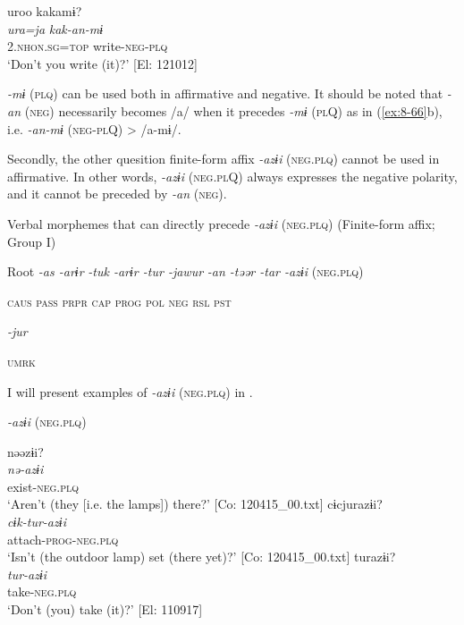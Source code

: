   {\TM}
\glll  uroo  kakamɨ?\\
\textit{ura=ja}  \textit{kak-an-mɨ}\\
    2.\textsc{nhon}.\textsc{sg}=\textsc{top}  write-\textsc{neg}-\textsc{plq}\\
\glt ‘Don’t you write (it)?’ [El: 121012]

\z
\z

\textit{-mɨ} (\textsc{plq}) can be used both in affirmative and negative. It should be noted that \textit{-an} (\textsc{neg}) necessarily becomes /a/ when it precedes \textit{-mɨ} (\textsc{pl}Q) as in (\ref{ex:8-66}b), i.e. \textit{-an-mɨ} (\textsc{neg}-\textsc{pl}Q) > /a-mɨ/.

Secondly, the other quesition finite-form affix \textit{-azɨi} (\textsc{neg}.\textsc{plq}) cannot be used in affirmative. In other words, \textit{-azɨi} (\textsc{neg}.\textsc{pl}Q) always expresses the negative polarity, and it cannot be preceded by \textit{-an} (\textsc{neg}).

\ea\label{ex:8-67}
  Verbal morphemes that can directly precede \textit{-azɨi} (\textsc{neg}.\textsc{plq}) (Finite-form affix; Group I)

  Root  \textit{-as  -arɨr} %
\textit{-tuk  -arɨr  -tur  -jawur} %
\textit{-an  -təər  -tar  -azɨi} (\textsc{neg}.\textsc{plq})

    \textsc{caus}  \textsc{pass}  \textsc{prpr}  \textsc{cap}  \textsc{prog}  \textsc{pol}  \textsc{neg}  \textsc{rsl}  \textsc{pst}

          \textit{-jur}

          \textsc{umrk}
\z

I will present examples of \textit{-azɨi} (\textsc{neg}.\textsc{plq}) in .

\ea\label{ex:8-68}
  \textit{-azɨi} (\textsc{neg}.\textsc{plq})

\ea
{\TM}
\glll  nəəzɨi?\\
\textit{nə-azɨi}\\
exist-\textsc{neg}.\textsc{plq}\\
\glt ‘Aren’t (they [i.e. the lamps]) there?’ [Co: 120415\_00.txt]
\ex
{\TM}
\glll  cɨcjurazɨi?\\
\textit{cɨk-tur-azɨi}\\
attach-\textsc{prog}-\textsc{neg}.\textsc{plq}\\
\glt ‘Isn’t (the outdoor lamp) set (there yet)?’ [Co: 120415\_00.txt]
\ex
{\TM}
\glll  turazɨi?\\
\textit{tur-azɨi}\\
take-\textsc{neg}.\textsc{plq}\\
\glt ‘Don’t (you) take (it)?’ [El: 110917]
\z
\z

